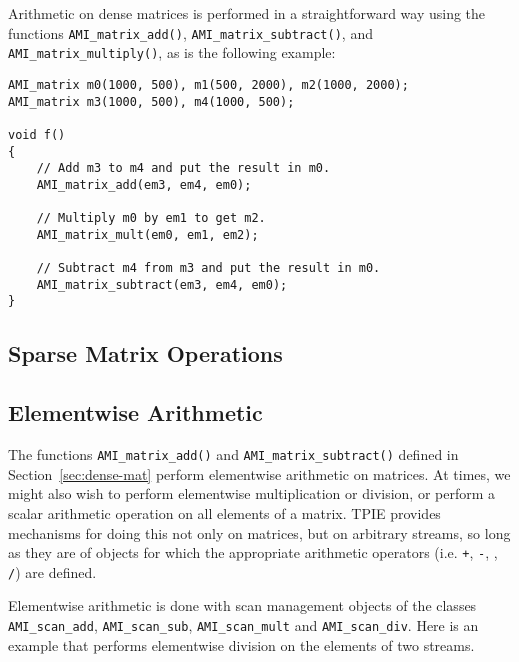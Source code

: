 Arithmetic on dense matrices is performed in a straightforward way
using the functions \verb|AMI_matrix_add()|,
\verb|AMI_matrix_subtract()|, and \verb|AMI_matrix_multiply()|, as is
the following example:

\begin{verbatim}
AMI_matrix m0(1000, 500), m1(500, 2000), m2(1000, 2000);
AMI_matrix m3(1000, 500), m4(1000, 500);

void f()
{
    // Add m3 to m4 and put the result in m0.
    AMI_matrix_add(em3, em4, em0);
   
    // Multiply m0 by em1 to get m2.
    AMI_matrix_mult(em0, em1, em2);

    // Subtract m4 from m3 and put the result in m0.
    AMI_matrix_subtract(em3, em4, em0);        
}
\end{verbatim}


\subsection{Sparse Matrix Operations}
\label{sec:sparse-mat}


\tobewritten


\subsection{Elementwise Arithmetic}
\label{sec:elementwise}

The functions \verb|AMI_matrix_add()|
and \verb|AMI_matrix_subtract()| defined in
Section~\ref{sec:dense-mat} perform elementwise arithmetic on
matrices.  At times, we might also wish to perform elementwise
multiplication or division, or perform a scalar arithmetic operation
on all elements of a matrix.  TPIE provides mechanisms for doing this
not only on matrices, but on arbitrary streams, so long as they are of
objects for which the appropriate arithmetic operators (i.e. {\tt +},
{\tt -}, {\tt *}, {\tt /}) are defined.

Elementwise arithmetic is done with scan management objects
 of the classes
\verb|AMI_scan_add|, \verb|AMI_scan_sub|, \verb|AMI_scan_mult| and
\verb|AMI_scan_div|.  Here is an example that performs
elementwise division on the elements of two streams.

